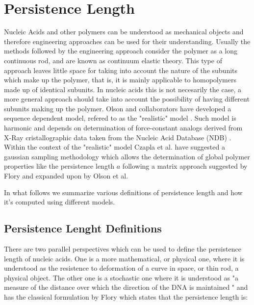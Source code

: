 \chapter{Persistence Length}
\label{appendix4a}

Nucleic  Acids and  other  polymers can  be  understood as  mechanical
objects   \cite{marko2003,  nelson2004}   and   therefore  engineering
approaches can  be used for their understanding.   Usually the methods
followed by  the engineering approach  consider the polymer as  a long
continuous rod, and  are known as continuum elastic  theory. This type
of approach leaves little space  for taking into account the nature of
the  subunits  which  make up  the  polymer,  that  is, it  is  mainly
applicable to  homopolymers made up of identical  subunits. In nucleic
acids this is not necesarily  the case, a more general approach should
take into account the  possibility of having different subunits making
up  the polymer.  Olson  and collaborators  have developed  a sequence
dependent model, refered to as the "realistic" model \cite{olson1993}.
Such model is harmonic  and depends on determination of force-constant
analogs  derived  from  X-Ray  cristallographic data  taken  from  the
Nucleic  Acid  Database  (NDB)  \cite{go1976, olson1998}.  Within  the
context of the "realistic" model Czapla et al.  \cite{czapla2006} have
suggested   a   gaussian  sampling   methodology   which  allows   the
determination of global polymer properties like the persistence length
$a$ following  a matrix  approach suggested by  Flory \cite{flory1969}
and expanded upon by Olson et al. \cite{maroun1998, marky1994}

In what follows we summarize various definitions of persistence length
and how it's computed using different models.
\section{Persistence Lenght Definitions}
There are two parallel perspectives  which can be used to define the
persistence length of  nucleic acids.  One is a  more mathematical, or
physical one, where it is  understood as the resistence to deformation
of a curve in space, or thin rod, a physical object.  The other one is a
stochastic one  where it is understood  as "a measure  of the distance
over which  the direction of  the DNA is  maintained \cite{olson1995}"
and  has the  classical formulation  by  Flory which  states that  the
persistence length is:

